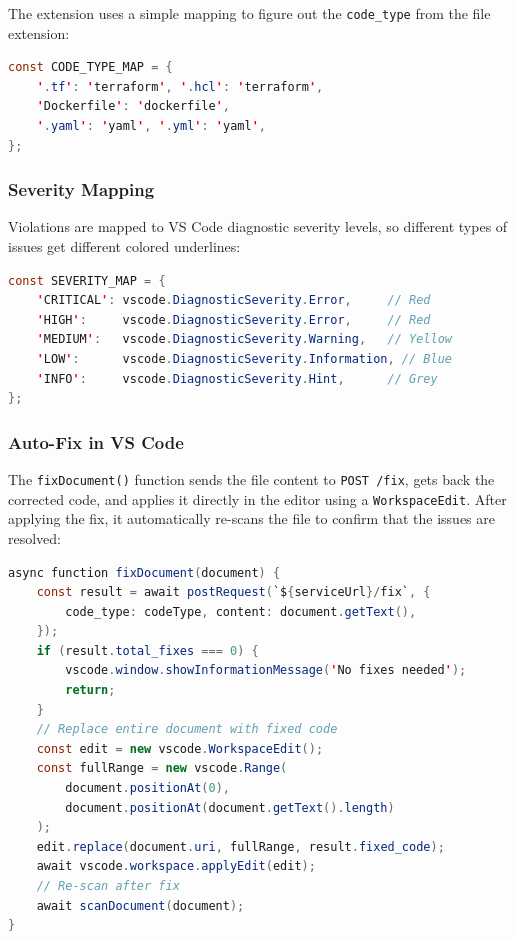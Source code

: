 The extension uses a simple mapping to figure out the \texttt{code\_type} from the file extension:

\begin{lstlisting}[language=Java, caption={File type detection mapping.}, label={lst:vscode-detect}]
const CODE_TYPE_MAP = {
    '.tf': 'terraform', '.hcl': 'terraform',
    'Dockerfile': 'dockerfile',
    '.yaml': 'yaml', '.yml': 'yaml',
};
\end{lstlisting}

\subsubsection{Severity Mapping}

Violations are mapped to VS Code diagnostic severity levels, so different types of issues get different colored underlines:

\begin{lstlisting}[language=Java, caption={Severity mapping to VS Code diagnostics.}, label={lst:vscode-severity}]
const SEVERITY_MAP = {
    'CRITICAL': vscode.DiagnosticSeverity.Error,     // Red
    'HIGH':     vscode.DiagnosticSeverity.Error,     // Red
    'MEDIUM':   vscode.DiagnosticSeverity.Warning,   // Yellow
    'LOW':      vscode.DiagnosticSeverity.Information, // Blue
    'INFO':     vscode.DiagnosticSeverity.Hint,      // Grey
};
\end{lstlisting}

\subsubsection{Auto-Fix in VS Code}

The \texttt{fixDocument()} function sends the file content to \texttt{POST /fix}, gets back the corrected code, and applies it directly in the editor using a \texttt{WorkspaceEdit}. After applying the fix, it automatically re-scans the file to confirm that the issues are resolved:

\begin{lstlisting}[language=Java, caption={VS Code auto-fix implementation (excerpt).}, label={lst:vscode-fix}]
async function fixDocument(document) {
    const result = await postRequest(`${serviceUrl}/fix`, {
        code_type: codeType, content: document.getText(),
    });
    if (result.total_fixes === 0) {
        vscode.window.showInformationMessage('No fixes needed');
        return;
    }
    // Replace entire document with fixed code
    const edit = new vscode.WorkspaceEdit();
    const fullRange = new vscode.Range(
        document.positionAt(0),
        document.positionAt(document.getText().length)
    );
    edit.replace(document.uri, fullRange, result.fixed_code);
    await vscode.workspace.applyEdit(edit);
    // Re-scan after fix
    await scanDocument(document);
}
\end{lstlisting}

